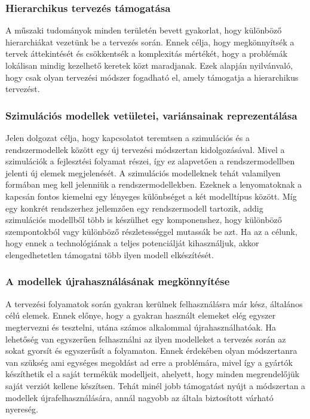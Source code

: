         \subsubsection{Hierarchikus tervezés támogatása} \label{sec:Hierarhia}
        A műszaki tudományok minden területén bevett gyakorlat, hogy különböző hierarchiákat vezetünk be a tervezés során.
        Ennek célja, hogy megkönnyítsék a tervek áttekintését és csökkentsék a komplexitás mértékét, hogy a problémák lokálisan mindig kezelhető keretek közt maradjanak.
        Ezek alapján nyilvánvaló, hogy csak olyan tervezési módszer fogadható el, amely támogatja a hierarchikus tervezést.

        \subsubsection{Szimulációs modellek vetületei, variánsainak reprezentálása} \label{sec:SzimIntKov}
        Jelen dolgozat célja, hogy kapcsolatot teremtsen a szimulációs és a rendszermodellek között egy új tervezési módszertan kidolgozásával.
        Mivel a szimulációk a fejlesztési folyamat részei, így ez alapvetően a rendszermodellben jelenti új elemek megjelenését.
        A szimulációs modelleknek tehát valamilyen formában meg kell jelenniük a rendszermodellekben.
        Ezeknek a lenyomatoknak a kapcsán fontos kiemelni egy lényeges különbséget a két modelltípus között.
        Míg egy konkrét rendszerhez jellemzően egy rendszermodell tartozik, addig szimulációs modellből több is készülhet egy komponenshez, hogy különböző szempontokból vagy különböző részletességgel mutassák be azt.
        Ha az a célunk, hogy ennek a technológiának a teljes potenciálját kihasználjuk, akkor elengedhetetlen támogatni több ilyen modell elkészítését.

        \subsubsection{A modellek újrahasználásának megkönnyítése} \label{sec:Ujrahasznalas}
        A tervezési folyamatok során gyakran kerülnek felhasználásra már kész, általános célú elemek.
        Ennek előnye, hogy a gyakran használt elemeket elég egyszer megtervezni és tesztelni, utána számos alkalommal újrahasználhatóak.
        Ha lehetőség van egyszerűen felhasználni az ilyen modelleket a tervezés során az sokat gyorsít és egyszerűsít a folyamaton.
        Ennek érdekében olyan módszertanra van szükség ami egységes megoldást ad erre a problémára, mivel így a gyártók készíthetik el a saját termékük modelljeit, ahelyett, hogy minden megrendelőjük saját verziót kellene készítsen.
        Tehát minél jobb támogatást nyújt a módszertan a modellek újrafelhasználására, annál nagyobb az általa biztosított várható nyereség.

